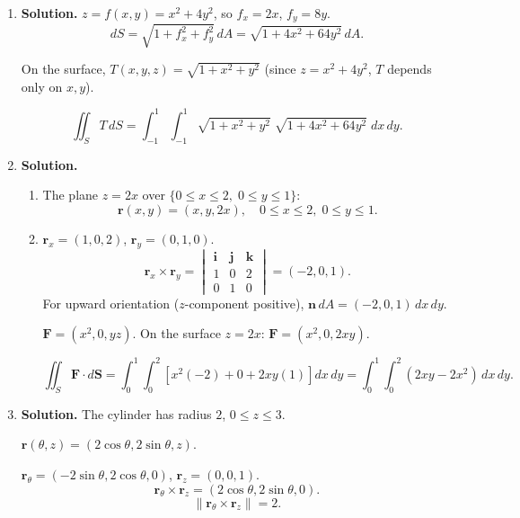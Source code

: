 \begin{enumerate}
For a surface $z=f(x,y)$, the surface area element is $dS = \sqrt{1+f_x^2+f_y^2}\,dA$.

Here $f_x=-2x$, $f_y=-2y$, so $\sqrt{1+4x^2+4y^2}$.

\[
\text{Surface Area} = \iint_{x^2+y^2\le 5}\sqrt{1+4x^2+4y^2}\,dA.
\]

In polar coordinates ($x=r\cos\theta$, $y=r\sin\theta$):
\[
\boxed{\text{Surface Area} = \int_0^{2\pi}\int_0^{\sqrt{5}}\sqrt{1+4r^2}\;r\,dr\,d\theta.}
\]

\item \textbf{Solution.}
$z=f(x,y)=x^2+4y^2$, so $f_x=2x$, $f_y=8y$.
\[
dS = \sqrt{1+f_x^2+f_y^2}\,dA = \sqrt{1+4x^2+64y^2}\,dA.
\]

On the surface, $T(x,y,z) = \sqrt{1+x^2+y^2}$ (since $z=x^2+4y^2$, $T$ depends only on $x,y$).

\[
\boxed{\iint_S T\,dS = \int_{-1}^{1}\int_{-1}^{1}\sqrt{1+x^2+y^2}\;\sqrt{1+4x^2+64y^2}\;dx\,dy.}
\]

\item \textbf{Solution.}
\begin{enumerate}
\item The plane $z=2x$ over $\{0\le x\le 2,\;0\le y\le 1\}$:
\[
\mathbf{r}(x,y)=(x, y, 2x), \quad 0\le x\le 2,\;0\le y\le 1.
\]

\item $\mathbf{r}_x=(1,0,2)$, $\mathbf{r}_y=(0,1,0)$.
\[
\mathbf{r}_x\times\mathbf{r}_y = \begin{vmatrix}\mathbf{i}&\mathbf{j}&\mathbf{k}\\ 1&0&2\\ 0&1&0\end{vmatrix} = (-2, 0, 1).
\]
For upward orientation ($z$-component positive), $\mathbf{n}\,dA = (-2,0,1)\,dx\,dy$.

$\mathbf{F}=(x^2, 0, yz)$. On the surface $z=2x$: $\mathbf{F}=(x^2, 0, 2xy)$.

\[
\boxed{\iint_S\mathbf{F}\cdot d\mathbf{S} = \int_0^1\int_0^2\left[x^2(-2)+0+2xy(1)\right]dx\,dy = \int_0^1\int_0^2(2xy-2x^2)\,dx\,dy.}
\]
\end{enumerate}

\item \textbf{Solution.}
The cylinder has radius $2$, $0\le z\le 3$.

$\mathbf{r}(\theta,z)=(2\cos\theta, 2\sin\theta, z)$.

$\mathbf{r}_\theta=(-2\sin\theta, 2\cos\theta, 0)$, $\mathbf{r}_z=(0,0,1)$.
\[
\mathbf{r}_\theta\times\mathbf{r}_z = (2\cos\theta, 2\sin\theta, 0).
\]
\[
\|\mathbf{r}_\theta\times\mathbf{r}_z\| = 2.
\]


\end{enumerate}
